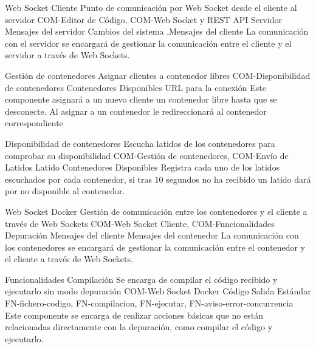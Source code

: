 \begin{component}{Web Socket Cliente}
{Punto de comunicación por Web Socket desde el cliente al servidor}
{COM-Editor de Código, COM-Web Socket y REST API Servidor} %
{Mensajes del servidor} %
{Cambios del sistema ,Mensajes del cliente} %
{} %
La comunicación con el servidor se encargará de gestionar la comunicación entre el cliente y el servidor a través de Web Sockets. %
\end{component}


\begin{component}{Gestión de contenedores}
{Asignar clientes a contenedor libres}
{COM-Disponibilidad de contenedores} %
{Contenedores Disponibles} %
{URL para la conexión} %
{\NA} %
Este componente asignará a un nuevo cliente un contenedor libre hasta que se desconecte. Al asignar a un contenedor le redireccionará al contenedor correspondiente %
\end{component}

\begin{component}{Disponibilidad de contenedores}
{Escucha latidos de los contenedores para comprobar su disponibilidad }
{COM-Gestión de contenedores, COM-Envío de Latidos} %
{Latido} %
{Contenedores Disponibles} %
{\NA} %
Registra cada uno de los latidos escuchados por cada contenedor, si tras 10 segundos no ha recibido un latido dará por no disponible al contenedor. %
\end{component}


\begin{component}{Web Socket Docker}
{Gestión de comunicación entre los contenedores y el cliente a través de Web Sockets}
{COM-Web Socket Cliente, COM-Funcionalidades Depuración} %
{Mensajes del cliente} %
{Mensajes del contenedor} %
{\NA} %
La comunicación con los contenedores se encargará de gestionar la comunicación entre el contenedor y el cliente a través de Web Sockets. %
\end{component}

\begin{component}{Funcionalidades Compilación}
{Se encarga de compilar el código recibido y ejecutarlo sin modo depuración}
{COM-Web Socket Docker}
{Código}
{Salida Estándar}
{FN-fichero-codigo, FN-compilacion, FN-ejecutar, FN-aviso-error-concurrencia}
Este componente se encarga de realizar acciones básicas que no están relacionadas directamente con la depuración, como compilar el código y ejecutarlo.
\end{component}

